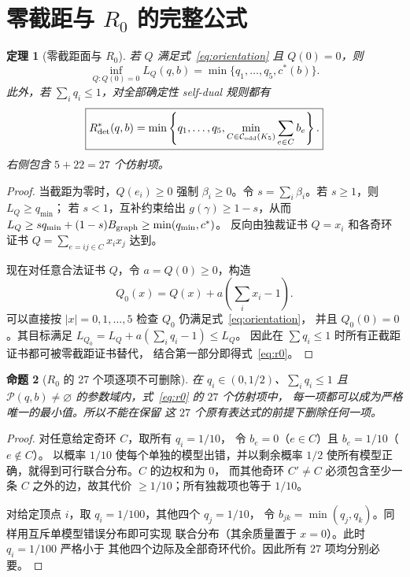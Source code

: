\documentclass[11pt,a4paper]{ctexart}
\newtheorem{theorem}{定理}[section]
\newtheorem{proposition}[theorem]{命题}
\theoremstyle{remark}
\newcommand{\CE}{\mathcal C_{\rm odd}(K_5)}
\newcommand{\Rstar}{R^*_{\rm det}}
\begin{document}
\section{零截距与 $R_0$ 的完整公式}
\begin{theorem}[零截距面与 $R_0$]\label{thm:r0}
若 $Q$ 满足式~\eqref{eq:orientation} 且 $Q(0)=0$，则
\[
\inf_{Q:Q(0)=0} L_Q(q,b)=\min\{q_1,\ldots,q_5,c^*(b)\}.
\]
此外，若 $\sum_iq_i\le1$，对\emph{全部}确定性 self-dual 规则都有
\begin{equation}\label{eq:r0}
\boxed{\Rstar(q,b)=\min\left\{q_1,\ldots,q_5,
\min_{C\in\CE}\sum_{e\in C}b_e\right\}.}
\end{equation}
右侧包含 $5+22=27$ 个仿射项。
\end{theorem}
\begin{proof}
当截距为零时，$Q(e_i)\ge0$ 强制 $\beta_i\ge0$。令
$s=\sum_i\beta_i$。若 $s\ge1$，则 $L_Q\ge q_{\min}$；
若 $s<1$，互补约束给出 $g(\gamma)\ge1-s$，从而
$L_Q\ge sq_{\min}+(1-s)B_{\rm graph}\ge\min(q_{\min},c^*)$。
反向由独裁证书 $Q=x_i$ 和各奇环证书
$Q=\sum_{e=ij\in C}x_ix_j$ 达到。

现在对任意合法证书 $Q$，令 $a=Q(0)\ge0$，构造
\[
Q_0(x)=Q(x)+a\left(\sum_i x_i-1\right).
\]
可以直接按 $|x|=0,1,\ldots,5$ 检查 $Q_0$ 仍满足式~\eqref{eq:orientation}，
并且 $Q_0(0)=0$。其目标满足
$L_{Q_0}=L_Q+a(\sum_iq_i-1)\le L_Q$。
因此在 $\sum q_i\le1$ 时所有正截距证书都可被零截距证书替代，
结合第一部分即得式~\eqref{eq:r0}。
\end{proof}

\begin{proposition}[$R_0$ 的 27 个项逐项不可删除]\label{prop:irreducible}
在 $q_i\in(0,1/2)$、$\sum_iq_i\le1$ 且 $\mathcal P(q,b)\ne\varnothing$
的参数域内，式~\eqref{eq:r0} 的 $27$ 个仿射项中，
每一项都可以成为\emph{严格唯一的最小值}。所以不能在保留
这 $27$ 个原有表达式的前提下删除任何一项。
\end{proposition}
\begin{proof}
对任意给定奇环 $C$，取所有 $q_i=1/10$，
令 $b_e=0$（$e\in C$）且 $b_e=1/10$（$e\notin C$）。
以概率 $1/10$ 使每个单独的模型出错，并以剩余概率 $1/2$
使所有模型正确，就得到可行联合分布。$C$ 的边权和为 $0$，
而其他奇环 $C'\ne C$ 必须包含至少一条 $C$ 之外的边，故其代价
$\ge1/10$；所有独裁项也等于 $1/10$。

对给定顶点 $i$，取 $q_i=1/100$，其他四个 $q_j=1/10$，
令 $b_{jk}=\min(q_j,q_k)$。同样用互斥单模型错误分布即可实现
联合分布（其余质量置于 $x=0$）。此时 $q_i=1/100$ 严格小于
其他四个边际及全部奇环代价。因此所有 $27$ 项均分别必要。
\end{proof}
\end{document}
